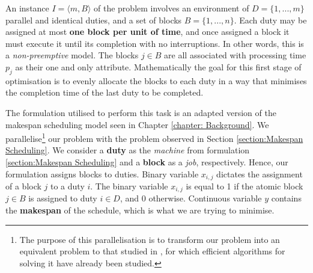 \vspace{\baselineskip}
\noindent
An instance $I = \langle{m},B\rangle{}$ of the problem involves  an environment of $D=\{1,...,m\}$ parallel and identical duties, and a set of blocks $B =\{1,...,n\}$. Each duty may be assigned at most \textbf{one block per unit of time}, and once assigned a block it must execute it until its completion with no interruptions. In other words, this is a \textit{non-preemptive} model. %
The blocks $j \in B$ are all associated with processing time $p_{j}$ as their one and only attribute. Mathematically the goal for this first stage of optimisation is to evenly allocate the blocks to each duty in a way that minimises the completion time of the last duty to be completed. 

\vspace{\baselineskip}
\noindent
The formulation utilised to perform this task is an adapted version %
of the makespan scheduling model seen in Chapter \ref{chapter: Background}. We parallelise\footnote{The purpose of this parallelisation is to transform our problem into an equivalent problem to that studied in \cite{PRAKASH2010}, for which efficient algorithms for solving it have already been studied.} our problem with the problem observed in Section \ref{section:Makespan Scheduling}. We consider a \textbf{duty} as the \textit{machine} from formulation \ref{section:Makespan Scheduling} and a \textbf{block} as a \textit{job}, respectively. Hence, our formulation assigns blocks to duties. Binary variable $x_{i,j}$ dictates the assignment of a block $j$ to a duty $i$. The binary variable $x_{i,j}$ is equal to 1 if the atomic block $j \in B$ is assigned to duty $i \in D$, and 0 otherwise. Continuous variable $y$ contains the \textbf{makespan} of the schedule, which is what we are trying to minimise.  


